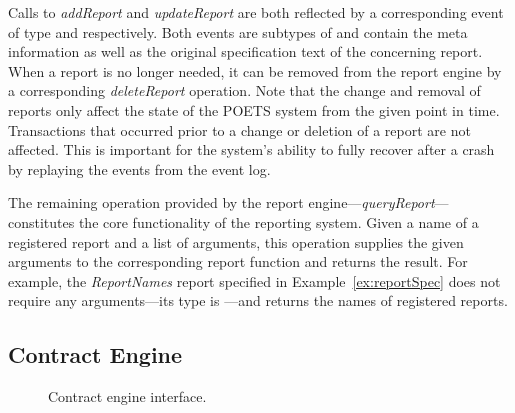 Calls to \emph{addReport} and \emph{updateReport} are both reflected
by a corresponding event of type  and
 respectively. Both events are subtypes of
 and contain the meta information as well as the
original specification text of the concerning report. When a report is
no longer needed, it can be removed from the report engine by a
corresponding \emph{deleteReport} operation.
Note that the change and removal of reports only affect the state of
the POETS system from the given point in time. Transactions
that occurred prior to a change or deletion of a report are not
affected. This is important for the system's ability to fully recover
after a crash by replaying the events from the event log.

The remaining operation provided by the report
engine---\emph{queryReport}---constitutes the core functionality of
the reporting system. Given a name of a registered report and a list
of arguments, this operation supplies the given arguments to the
corresponding report function and returns the result.  For example,
the \emph{ReportNames} report specified in Example~\ref{ex:reportSpec}
does not require any arguments---its type is \prt{[String]}---and
returns the names of registered reports.


\subsection{Contract Engine}
\label{sec:contract-engine}

\begin{figure}[t]
  \centering\small
  \newcommand\comp[4][]{%
    \node[box,#1] (#2) {#3\nodepart{two}#4};
  }%
  \caption{Contract engine interface.}
  \label{fig:contract-engine}
\end{figure}


